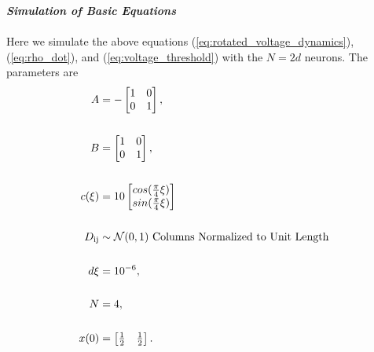 \textbf{\textit{Simulation of Basic Equations}}\\
\\
Here we simulate the above equations (\ref{eq:rotated_voltage_dynamics}), (\ref{eq:rho_dot}), and (\ref{eq:voltage_threshold}) with the $N = 2d$ neurons. The parameters are
\begin{align}
\label{eq:sim_I_params}
A &= -\begin{bmatrix}  
1 & 0 \\
0 & 1
\end{bmatrix},\notag \\
\notag \\
B &= \begin{bmatrix}  
1 & 0 \\
0 & 1
\end{bmatrix}, \notag \\
\notag \\
c(\xi) &= 10 \begin{bmatrix} 
cos(\frac{\pi}{4} \xi)\\
sin(\frac{\pi}{4} \xi)
\end{bmatrix} \\
\notag \\
D_{\text{ij}} &\sim  \mathcal{N} (0, 1) \text{ Columns Normalized to Unit Length} \notag \\
\notag \\
d\xi &= 10^{-6}, \notag \\
\notag \\
N &= 4,\notag \\
\notag \\
x(0) &= \begin{bmatrix} \frac{1}{2} & \frac{1}{2} \end{bmatrix}.\notag 
\end{align}

